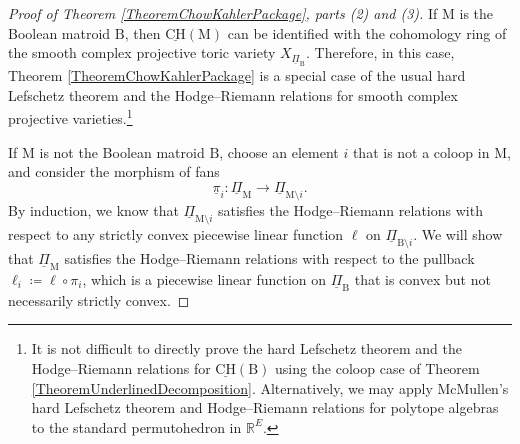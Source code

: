 \documentclass[11pt,reqno]{amsart}
\theoremstyle{definition}
\theoremstyle{remark}
\renewcommand{\(}{\left(}
\renewcommand{\)}{\right)}
\newcommand{\<}{\left<}
\renewcommand{\>}{\right>}
\begin{document}
\begin{proof}[Proof of Theorem \ref{TheoremChowKahlerPackage}, parts (2) and (3)]
If $\mathrm{M}$ is the Boolean matroid $\mathrm{B}$,
then $\underline{\mathrm{CH}}(\mathrm{M})$ can be identified with the cohomology ring of the 
smooth complex projective toric variety $X_{\underline{\Pi}_\mathrm{B}}$.
Therefore, in this case, Theorem \ref{TheoremChowKahlerPackage} is a special case of the usual hard Lefschetz theorem and the Hodge--Riemann relations for smooth complex projective varieties.\footnote{It is not difficult to directly prove the hard Lefschetz theorem and the Hodge--Riemann relations for $\underline{\mathrm{CH}}(\mathrm{B})$ using the coloop case of Theorem \ref{TheoremUnderlinedDecomposition}. Alternatively, we may apply McMullen's hard Lefschetz theorem and Hodge--Riemann relations for polytope algebras \cite {McMullen} to the standard permutohedron in $\mathbb{R}^E$.
}

If $\mathrm{M}$ is not the Boolean matroid $\mathrm{B}$, choose an element $i$ that is not a coloop in $\mathrm{M}$,
and consider the morphism of fans
\[
\underline{\pi}_i:\underline{\Pi}_{\mathrm{M}} \longrightarrow \underline{\Pi}_{\mathrm{M} \setminus i}.
\]
By induction, we know that $\underline{\Pi}_{\mathrm{M} \setminus i}$ satisfies the Hodge--Riemann relations with respect to any strictly convex piecewise linear function $\ell$ on $\underline{\Pi}_{\mathrm{B} \setminus i}$.
We will show that $\underline{\Pi}_\mathrm{M}$ satisfies the Hodge--Riemann relations with respect to the pullback  $\ell_i\coloneq \ell \circ \pi_i$, which is a piecewise linear function on $\underline{\Pi}_\mathrm{B}$ that is convex but not necessarily strictly convex.


\end{proof}
\end{document}
